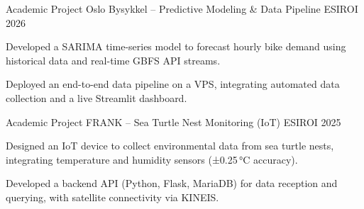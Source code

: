 

\begin{cventries}

\cventry
  {Academic Project} %
  {Oslo Bysykkel -- Predictive Modeling \& Data Pipeline} %
  {ESIROI} %
  {2026} %
  {
    \begin{cvitems}
      \item {Developed a SARIMA time-series model to forecast hourly bike demand using historical data and real-time GBFS API streams.}
      \item {Deployed an end-to-end data pipeline on a VPS, integrating automated data collection and a live Streamlit dashboard.}
    \end{cvitems}
  }

\cventry
  {Academic Project} %
  {FRANK -- Sea Turtle Nest Monitoring (IoT)} %
  {ESIROI} %
  {2025} %
  {
    \begin{cvitems}
      \item {Designed an IoT device to collect environmental data from sea turtle nests, integrating temperature and humidity sensors (±0.25\,°C accuracy).} 
      \item {Developed a backend API (Python, Flask, MariaDB) for data reception and querying, with satellite connectivity via KINEIS.}
    \end{cvitems}
  }

\end{cventries}
